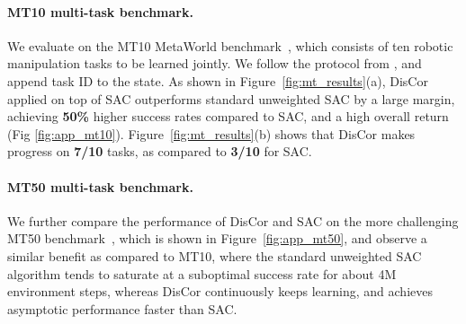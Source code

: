 \documentclass[jmlr]{article}
\begin{document}
\paragraph{MT10 multi-task benchmark.} We evaluate on the MT10 MetaWorld benchmark~\citep{yu2019meta}, which consists of ten robotic manipulation tasks to be learned jointly. We follow the protocol from \cite{yu2019meta}, and append task ID to the state. As shown in Figure~\ref{fig:mt_results}(a), DisCor applied on top of SAC outperforms standard unweighted SAC by a large margin, achieving \textbf{50\%} higher success rates compared to SAC, and a high overall return (Fig \ref{fig:app_mt10}). Figure~\ref{fig:mt_results}(b) shows that DisCor makes progress on \textbf{7/10} tasks, as compared to \textbf{3/10} for SAC. 

\paragraph{MT50 multi-task benchmark.} We further compare the performance of DisCor and SAC on the more challenging MT50 benchmark~\citep{yu2019meta}, which is shown in Figure~\ref{fig:app_mt50}, and observe a similar benefit as compared to MT10, where the standard unweighted SAC algorithm tends to saturate at a suboptimal success rate for about 4M environment steps, whereas DisCor continuously keeps learning, and achieves asymptotic performance faster than SAC. 
\end{document}

